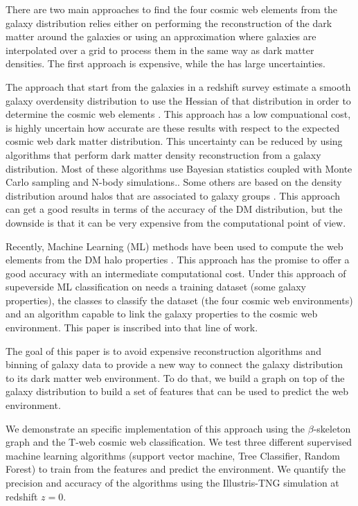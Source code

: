 \documentclass[usenatbib]{mnras}
\begin{document}
There are two main approaches to find the four cosmic web elements
from the galaxy distribution relies either on performing 
the reconstruction of the dark matter around the galaxies
or using an approximation where galaxies are interpolated over a 
grid to process them in the same way as dark matter densities.
The first approach is expensive, while the has large uncertainties.

The approach that start from the galaxies in a redshift survey estimate a
smooth galaxy overdensity distribution to use the Hessian of that
distribution in order to determine the cosmic web
elements  \citep{Eardley2015,Alpaslan2016,Tojeiro2017,Shadab2019}. 
This approach has a low compuational cost, is highly uncertain how accurate are these results with respect to the expected 
cosmic web dark matter distribution.
This uncertainty can be reduced by using algorithms that perform dark matter density reconstruction from a galaxy distribution.
Most of these algorithms use Bayesian statistics coupled with Monte
Carlo sampling  and N-body simulations.\citep{Jasche2010,Jasche2013a,Bos2014,LeclercqJasche2015,Horowitz2019,Burchett2020}.
Some others are based on the density distribution around halos that are associated to galaxy groups \citep{Wang2009,2011MNRAS.417.1303M}. 
This approach can get a good results in terms of the accuracy of the 
DM distribution, but the downside is that it can be very expensive from the computational point of view.


Recently, Machine Learning (ML) methods have been used to compute the
web elements from the DM halo properties \citep{Hui2018}. 
This approach has the promise to offer a good accuracy with an intermediate computational cost.
Under this approach of supeverside ML classification on needs a training
dataset (some galaxy properties), the classes to classify the dataset (the four cosmic web environments) and an algorithm capable to link 
the galaxy properties to the cosmic web environment.
This paper is inscribed into that line of work.



The goal of this paper is to avoid expensive reconstruction algorithms
and binning of galaxy data to provide a new way to connect the galaxy
distribution to its dark matter web environment.
To do that, we build a graph on top of the galaxy distribution 
to build a set of features that can be used to predict the web
environment.

We demonstrate an specific implementation of this approach using 
the $\beta$-skeleton graph \citep{Fang2019} and the 
T-web \citep{Forero-Romero2009} cosmic web classification.
We test three different supervised machine learning
algorithms (support vector machine, Tree Classifier, Random Forest) 
to train from the features and predict the environment.
We quantify the precision and accuracy of the algorithms using 
the Illustris-TNG simulation \citep{Nelson2015} at redshift $z=0$.
\end{document}
